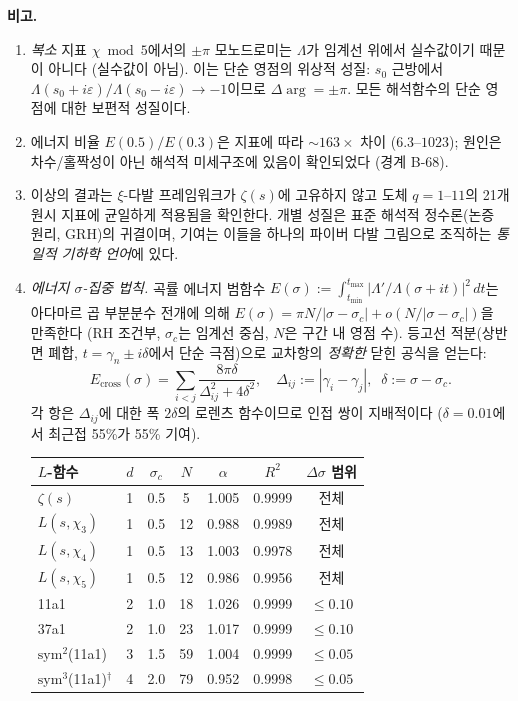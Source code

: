 \documentclass[11pt, a4paper]{article}
\theoremstyle{definition}
\theoremstyle{plain}
\begin{document}
\medskip\noindent\textbf{비고.}
\begin{enumerate}
\item \emph{복소} 지표 $\chi\bmod 5$에서의 $\pm\pi$ 모노드로미는 $\Lambda$가 임계선 위에서 실수값이기 때문이 아니다 (실수값이 아님). 이는 단순 영점의 위상적 성질: $s_0$ 근방에서 $\Lambda(s_0+i\varepsilon)/\Lambda(s_0-i\varepsilon) \to -1$이므로 $\Delta\arg = \pm\pi$. 모든 해석함수의 단순 영점에 대한 보편적 성질이다.
\item 에너지 비율 $E(0.5)/E(0.3)$은 지표에 따라 $\sim 163\times$ 차이 ($6.3$--$1023$);
  원인은 차수/홀짝성이 아닌 해석적 미세구조에 있음이 확인되었다 (경계 B-68).
\item 이상의 결과는 $\xi$-다발 프레임워크가 $\zeta(s)$에 고유하지 않고
  도체 $q = 1$--$11$의 21개 원시 지표에 균일하게 적용됨을 확인한다.
  개별 성질은 표준 해석적 정수론(논증 원리, GRH)의 귀결이며, 기여는 이들을 하나의 파이버 다발 그림으로 조직하는 \emph{통일적 기하학 언어}에 있다.
\item \emph{에너지 $\sigma$-집중 법칙.}\;
곡률 에너지 범함수
$E(\sigma):=\int_{t_{\min}}^{t_{\max}}|\Lambda'/\Lambda(\sigma+it)|^{2}\,dt$는
아다마르 곱 부분분수 전개에 의해
$E(\sigma)=\pi N/|\sigma-\sigma_c|+o(N/|\sigma-\sigma_c|)$을 만족한다
(RH 조건부, $\sigma_c$는 임계선 중심, $N$은 구간 내 영점 수).
등고선 적분(상반면 폐합, $t=\gamma_n\pm i\delta$에서 단순 극점)으로
교차항의 \emph{정확한} 닫힌 공식을 얻는다:
\begin{equation}\label{eq:cross_term_exact_ko}
  E_{\mathrm{cross}}(\sigma)
    = \sum_{i<j}\frac{8\pi\delta}{\Delta_{ij}^{2}+4\delta^{2}},
  \quad \Delta_{ij}:=|\gamma_i-\gamma_j|,\;\;
  \delta:=\sigma-\sigma_c.
\end{equation}
각 항은 $\Delta_{ij}$에 대한 폭 $2\delta$의 로렌츠 함수이므로
인접 쌍이 지배적이다 ($\delta=0.01$에서 최근접 55\%가 55\% 기여).

\smallskip
\begin{center}
\small
\begin{tabular}{@{}lcccccc@{}}
\toprule
$L$-함수 & $d$ & $\sigma_c$ & $N$ & $\alpha$ & $R^{2}$ & $\Delta\sigma$ 범위 \\
\midrule
$\zeta(s)$ & 1 & 0.5 & 5 & 1.005 & 0.9999 & 전체 \\
$L(s,\chi_3)$ & 1 & 0.5 & 12 & 0.988 & 0.9989 & 전체 \\
$L(s,\chi_4)$ & 1 & 0.5 & 13 & 1.003 & 0.9978 & 전체 \\
$L(s,\chi_5)$ & 1 & 0.5 & 12 & 0.986 & 0.9956 & 전체 \\
\midrule
11a1 & 2 & 1.0 & 18 & 1.026 & 0.9999 & $\leq 0.10$ \\
37a1 & 2 & 1.0 & 23 & 1.017 & 0.9999 & $\leq 0.10$ \\
\midrule
$\mathrm{sym}^2$(11a1) & 3 & 1.5 & 59 & 1.004 & 0.9999 & $\leq 0.05$ \\
\midrule
$\mathrm{sym}^3$(11a1)${}^\dagger$ & 4 & 2.0 & 79 & 0.952 & 0.9998 & $\leq 0.05$ \\
\bottomrule
\end{tabular}
\end{center}


\end{enumerate}
\end{document}
